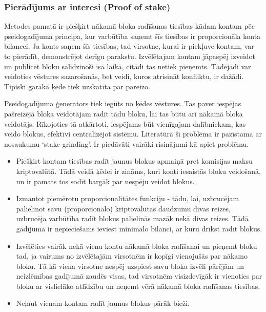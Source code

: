 \subsubsection{Pierādījums ar interesi (Proof of stake)}
Metodes pamatā ir piešķirt nākamā bloka radīšanas tiesības kādam kontam pēc pseidogadījuma principa, kur varbūtība saņemt šīs tiesības ir proporcionāla konta bilancei. Ja konts saņem šīs tiesības, tad virsotne, kurai ir piekļuve kontam, var to pierādīt, demonstrējot derīgu parakstu. Izvēlētajam kontam jāpaspēj izveidot un publicēt bloku salīdzinoši īsā laikā, citādi tas netiek pieņemts. Tādējādi var veidoties vēstures sazarošanās, bet veidi, kuros atrisināt konfliktu, ir dažādi. Tipiski garākā ķēde tiek uzskatīta par pareizo.

Pseidogadījuma ģenerators tiek iegūts no ķēdes vēstures. Tas paver iespējas pašreizējā bloka veidotājam radīt tādu bloku, lai tas būtu arī nākamā bloka veidotājs. Rīkojoties tā atkārtoti, iespējams būt vienīgajam dalībniekam, kas veido blokus, efektīvi centralizējot sistēmu. Literatūrā šī problēma ir pazīstama ar nosaukumu `stake grinding'. Ir piedāvāti vairāki risinājumi kā apiet problēmu.\cite{popov16,dannen17}
\begin{itemize}
    \item Piešķirt kontam tiesības radīt jaunus blokus apmaiņā pret komisijas maksu kriptovalūtā. 
    Tādā veidā ķēdei ir zināms, kuri konti iesaistās bloku veidošanā, un ir pamats tos sodīt bargāk par nespēju veidot blokus.
    \item Izmantot piemērotu proporcionalitātes funkciju - tādu, lai, uzbrucējam palielinot savu (proporcionālo) kriptovalūtas daudzumu divas reizes, uzbrucēja varbūtība radīt blokus palielinās mazāk nekā divas reizes.\cite{popov16} Tādā gadījumā ir nepieciešams ieviest minimālo bilanci, ar kuru drīkst radīt blokus.
    \item Izvēlēties vairāk nekā vienu kontu nākamā bloka radīšanai un pieņemt bloku tad, ja vairums no izvēlētajām virsotnēm ir kopīgi vienojušās par nākamo bloku. Tā kā viena virsotne nespēj uzspiest savu bloka izvēli pārējām un neizlēmības gadījumā zaudēs visas, tad virsotnēm visizdevīgāk ir vienoties par bloku ar vislielāko atlīdzību un neņemt vērā nākamā bloka radīšanas tiesības.
    \item Neļaut vienam kontam radīt jaunus blokus pārāk bieži.
\end{itemize}

